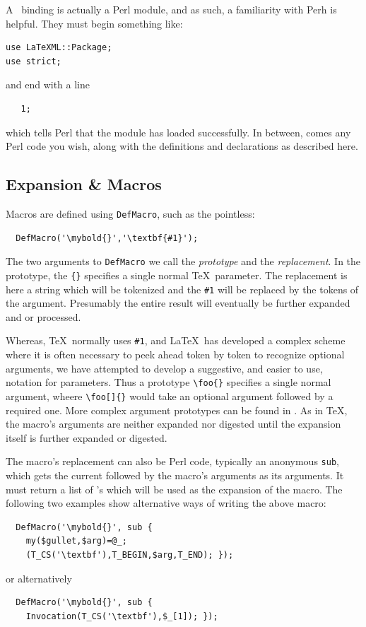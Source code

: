 \documentclass{book}
\begin{document}
A \LaTeXML\ binding is actually a Perl module, and as such, 
a familiarity with Perh is helpful.
They must begin something like:
\begin{verbatim}
use LaTeXML::Package;
use strict;
\end{verbatim}
and end with a line
\begin{verbatim}
   1;
\end{verbatim}
which tells Perl that the module has loaded successfully.
In between, comes any Perl code you wish, along with the definitions
and declarations as described here.

\subsection[Expansion]{Expansion \& Macros}\label{customization.latexml.expansion}
Macros are defined using \texttt{DefMacro}, such as the pointless:
\begin{verbatim}
  DefMacro('\mybold{}','\textbf{#1}');
\end{verbatim}
The two arguments to \texttt{DefMacro} we call
the \emph{prototype} and the \emph{replacement}.
In the prototype, the \verb|{}| specifies a single normal \TeX\ parameter.
The replacement is here a string which will
be tokenized and the \verb|#1| will be replaced by the
tokens of the argument. Presumably the entire result will
eventually be further expanded and or processed.

Whereas, \TeX\ normally uses \verb|#1|, and \LaTeX\ has developed
a complex scheme where it is often necessary to peek ahead token
by token to recognize optional arguments, we have attempted
to develop a suggestive, and easier to use, notation for parameters.
Thus a prototype \verb|\foo{}| specifies a single normal argument,
wheere \verb|\foo[]{}| would take an optional argument followed
by a required one.  More complex argument prototypes can be
found in .
As in \TeX, the macro's arguments are neither expanded
nor digested until the expansion itself is further
expanded or digested.

The macro's replacement can also be Perl code, typically an
anonymous \texttt{sub}, which gets the current 
followed by the macro's arguments as its arguments.  It must
return a list of 's which will be used as the
expansion of the macro.  The following two examples show
alternative ways of writing the above macro:
\begin{verbatim}
  DefMacro('\mybold{}', sub {
    my($gullet,$arg)=@_;
    (T_CS('\textbf'),T_BEGIN,$arg,T_END); });
\end{verbatim}
or alternatively
\begin{verbatim}
  DefMacro('\mybold{}', sub {
    Invocation(T_CS('\textbf'),$_[1]); });
\end{verbatim}
\end{document}
